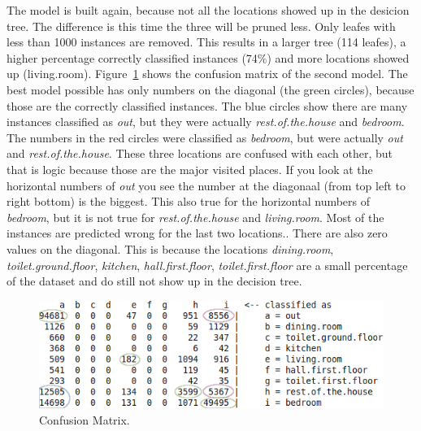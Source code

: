 	The model is built again, because not all the locations showed up in the desicion tree. The difference is this time the three will be pruned less. Only leafes with less than 1000 instances are removed. This results in a larger tree (114 leafes), a higher percentage correctly classified instances (74\%) and more locations showed up (living.room). Figure~\ref{fig:confusionmatrix} shows the confusion matrix of the second model. The best model possible has only numbers on the diagonal (the green circles), because those are the correctly classified instances. The blue circles show there are many instances classified as \emph{out}, but they were actually \emph{rest.of.the.house} and \emph{bedroom}. The numbers in the red circles were classified as \emph{bedroom}, but were actually \emph{out} and \emph{rest.of.the.house}. These three locations are confused with each other, but that is logic because those are the major visited places. If you look at the horizontal numbers of \emph{out} you see the number at the diagonaal (from top left to right bottom) is the biggest. This also true for the horizontal numbers of \emph{bedroom}, but it is not true for \emph{rest.of.the.house} and \emph{living.room}. Most of the instances are predicted wrong for the last two locations.. There are also zero values on the diagonal. This is because the locations \emph{dining.room}, \emph{toilet.ground.floor}, \emph{kitchen}, \emph{hall.first.floor}, \emph{toilet.first.floor} are a small percentage of the dataset and do still not show up in the decision tree.

			\begin{figure}[h]
				\centering
					\includegraphics[scale=0.7]{confusion.png}
					
				\caption{Confusion Matrix.}
				\label{fig:confusionmatrix}

			\end{figure}


